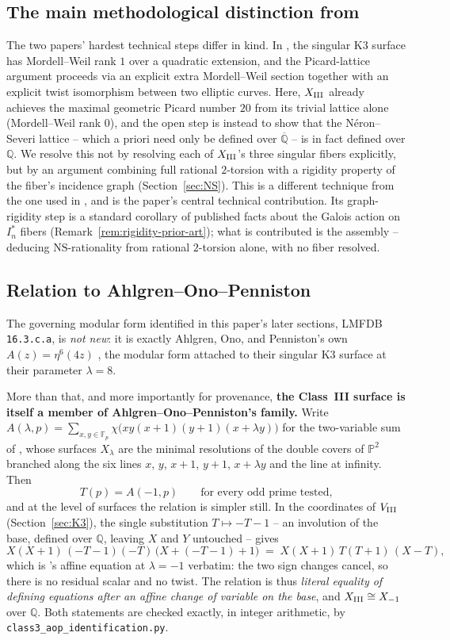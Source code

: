 \documentclass[11pt]{amsart}
\theoremstyle{definition}
\newcommand{\Fp}{\mathbb{F}_p}
\newcommand{\Q}{\mathbb{Q}}
\newcommand{\NS}{\mathrm{NS}}
\begin{document}
\subsection*{The main methodological distinction from \cite{ClassesI_II}}
The two papers' hardest technical steps differ in kind. In
\cite{ClassesI_II}, the singular K3 surface has Mordell--Weil rank $1$
over a quadratic extension, and the Picard-lattice argument proceeds via
an explicit extra Mordell--Weil section together with an explicit twist
isomorphism between two elliptic curves. Here, $X_{\rm III}$ already
achieves the maximal geometric Picard number $20$ from its trivial
lattice alone (Mordell--Weil rank $0$), and the open step is instead to
show that the N\'eron--Severi lattice -- which a priori need only be
defined over $\overline{\Q}$ -- is in fact defined over $\Q$. We resolve
this not by resolving each of $X_{\rm III}$'s three singular fibers
explicitly, but by an argument combining full rational $2$-torsion with a
rigidity property of the fiber's incidence graph (Section~\ref{sec:NS}).
This is a different technique from the one used in \cite{ClassesI_II},
and is the paper's central technical contribution. Its graph-rigidity
step is a standard corollary of published facts about the Galois action
on $I_n^*$ fibers (Remark~\ref{rem:rigidity-prior-art}); what is
contributed is the assembly -- deducing $\NS$-rationality from rational
$2$-torsion alone, with no fiber resolved.

\subsection*{Relation to Ahlgren--Ono--Penniston}
The governing modular form identified in this paper's later sections,
LMFDB \texttt{16.3.c.a}, is \emph{not new}: it is exactly Ahlgren, Ono,
and Penniston's own $A(z)=\eta^6(4z)$ \cite{AOP2002}, the modular form
attached to their singular K3 surface at their parameter $\lambda=8$.

More than that, and more importantly for provenance, \textbf{the
Class~III surface is itself a member of Ahlgren--Ono--Penniston's
family.} Write
$A(\lambda,p)=\sum_{x,y\in\Fp}\chi\bigl(xy(x+1)(y+1)(x+\lambda y)\bigr)$
for the two-variable sum of \cite{AOP2002}, whose surfaces $X_\lambda$ are
the minimal resolutions of the double covers of $\mathbb{P}^2$ branched
along the six lines $x$, $y$, $x+1$, $y+1$, $x+\lambda y$ and the line at
infinity. Then
\[
  T(p)=A(-1,p)\qquad\text{for every odd prime tested,}
\]
and at the level of surfaces the relation is simpler still. In the
coordinates of $V_{\rm III}$ (Section~\ref{sec:K3}), the single
substitution $T\mapsto-T-1$ -- an involution of the base, defined over
$\Q$, leaving $X$ and $Y$ untouched -- gives
\[
  X(X+1)\,(-T-1)(-T)\,\bigl(X+(-T-1)+1\bigr)
   \;=\; X(X+1)\,T(T+1)\,(X-T),
\]
which is \cite{AOP2002}'s affine equation at $\lambda=-1$ verbatim: the
two sign changes cancel, so there is no residual scalar and no twist.
The relation is thus \emph{literal equality of defining equations after an
affine change of variable on the base}, and $X_{\rm III}\cong X_{-1}$ over
$\Q$. Both statements are checked exactly, in integer arithmetic, by
\texttt{class3\_aop\_identification.py}.
\end{document}
